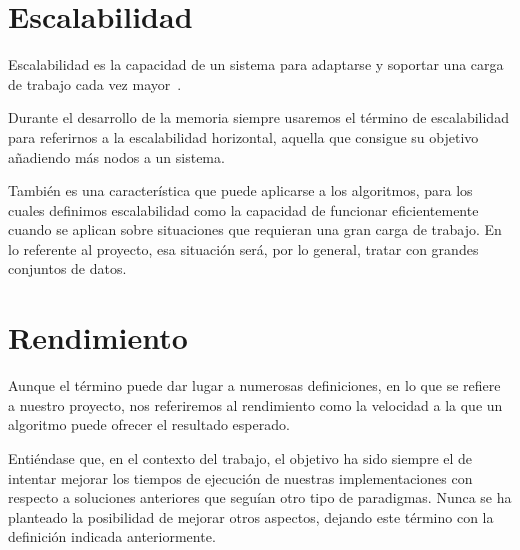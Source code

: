 \section{Escalabilidad}\label{sec:DefEscalabilidad}

Escalabilidad es la capacidad de un sistema para adaptarse y soportar una carga de trabajo cada vez mayor~\cite{Bondi:2000}.

Durante el desarrollo de la memoria siempre usaremos el término de escalabilidad para referirnos a la escalabilidad horizontal, aquella que consigue su objetivo añadiendo más nodos a un sistema.

También es una característica que puede aplicarse a los algoritmos, para los cuales definimos escalabilidad como la capacidad de funcionar eficientemente cuando se aplican sobre situaciones que requieran una gran carga de trabajo. En lo referente al proyecto, esa situación será, por lo general, tratar con grandes conjuntos de datos.

\section{Rendimiento}\label{sec:Rendimiento}

Aunque el término puede dar lugar a numerosas definiciones, en lo que se refiere a nuestro proyecto, nos referiremos al rendimiento como la velocidad a la que un algoritmo puede ofrecer el resultado esperado.

Entiéndase que, en el contexto del trabajo, el objetivo ha sido siempre el de intentar mejorar los tiempos de ejecución de nuestras implementaciones con respecto a soluciones anteriores que seguían otro tipo de paradigmas. Nunca se ha planteado la posibilidad de mejorar otros aspectos, dejando este término con la definición indicada anteriormente.


